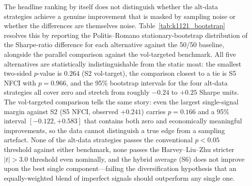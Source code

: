 \documentclass[12pt,a4paper]{article}
\begin{document}
The headline ranking by itself does not distinguish whether the alt-data strategies achieve a genuine improvement that is masked by sampling noise or whether the differences are themselves noise. Table~\ref{tab:k1121_bootstrap} resolves this by reporting the Politis--Romano stationary-bootstrap distribution of the Sharpe-ratio difference for each alternative against the 50/50 baseline, alongside the parallel comparison against the vol-targeted benchmark. All five alternatives are statistically indistinguishable from the static moat: the smallest two-sided $p$-value is $0.264$ (S2 vol-target), the comparison closest to a tie is S5 NFCI with $p=0.966$, and the 95\% bootstrap intervals for the four alt-data strategies all cover zero and stretch from roughly $-0.24$ to $+0.25$ Sharpe units. The vol-targeted comparison tells the same story: even the largest single-signal margin against S2 (S5 NFCI, observed $+0.241$) carries $p=0.166$ and a 95\% interval $[-0.122, +0.583]$ that contains both zero and economically meaningful improvements, so the data cannot distinguish a true edge from a sampling artefact. None of the alt-data strategies passes the conventional $p<0.05$ threshold against either benchmark, none passes the Harvey--Liu--Zhu \citep{harvey2016} stricter $|t|>3.0$ threshold even nominally, and the hybrid average (S6) does not improve upon the best single component---failing the diversification hypothesis that an equally-weighted blend of imperfect signals should outperform any single one.
\end{document}

